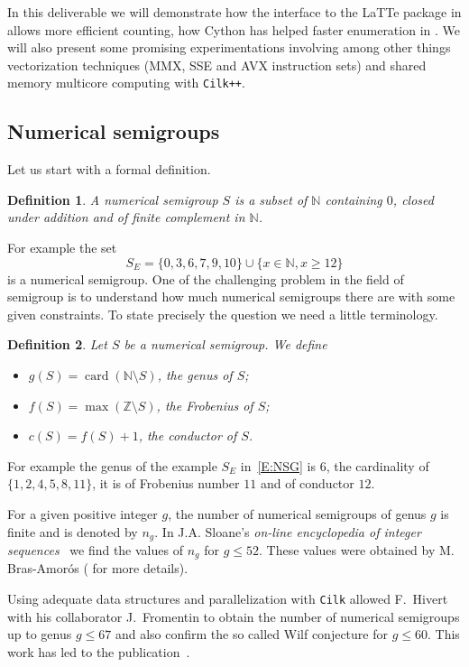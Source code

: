 \documentclass{deliverablereport}
\newcommand{\Cilk}{\texttt{Cilk}\xspace}
\newcommand{\CilkP}{\texttt{Cilk++}\xspace}
\newcommand{\NN}{\mathbb{N}}
\newtheorem{defi}{Definition}
\begin{document}
In this deliverable we will demonstrate how the interface to the LaTTe package
in \Sage allows more efficient counting, how Cython has helped faster enumeration
in \Sage. We will also present some promising experimentations involving among
other things vectorization techniques (MMX, SSE and AVX instruction sets) and
shared memory multicore computing with \CilkP.

\subsection{Numerical semigroups}

Let us start with a formal definition.
\begin{defi}
  A \emph{numerical semigroup} $S$ is a subset of $\NN$ containing $0$, closed
  under addition and of finite complement in $\NN$.
\end{defi}
For example the set
\begin{equation}
\label{E:NSG}
S_E=\{0,3,6,7,9,10\}\cup\{x\in\NN, x\geq 12\}
\end{equation}
is a numerical semigroup. One of the challenging problem in the field
of semigroup is to understand how much numerical semigroups there
are with some given constraints. To state precisely the question
we need a little terminology.
\begin{defi}
Let $S$ be a numerical semigroup. We define
\begin{itemize}
\item $g(S)=\operatorname{card}(\NN\setminus S)$, the \emph{genus} of $S$;
\item $f(S)=\max(\mathbb{Z}\setminus S)$, the \emph{Frobenius} of $S$;
\item $c(S)=f(S)+1$, the \emph{conductor of $S$}.
\end{itemize}
\end{defi}
For example the genus of the example $S_E$ in~\eqref{E:NSG} is $6$, the
cardinality of $\{1,2,4,5,8,11\}$, it is of Frobenius number $11$ and of
conductor $12$.

For a given positive integer $g$, the number of numerical semigroups of genus
$g$ is finite and is denoted by $n_g$. In J.A. Sloane's \emph{on-line
encyclopedia of integer sequences}~\cite{OEIS} we find the values of $n_g$
for $g\leq 52$. These values were obtained by M. Bras-Amor\'os
(\cite{BrasAmoros2008} for more details). 

Using adequate data structures and parallelization with \Cilk allowed
F.~Hivert with his collaborator J.~Fromentin to obtain the number of
numerical semigroups up to genus $g \leq 67$ and also confirm the so called
Wilf conjecture for $g \leq 60$. This work has led to the publication~\cite{FromentinH16}.
\end{document}
